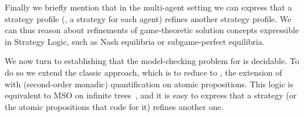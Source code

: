 Finally we briefly mention that in the multi-agent setting we can
express that a strategy profile (\ie, a strategy for each agent)
refines another strategy profile. We can thus reason about refinements
of game-theoretic solution concepts expressible in Strategy Logic,
such as  Nash equilibria or subgame-perfect equilibria.

We now turn to establishing that the model-checking problem for \SLref
is decidable. To do so we extend the classic approach, which is to
reduce to \QCTLs, the extension of \CTLs with (second-order monadic) quantification on atomic
propositions. This logic is equivalent to MSO on infinite
trees~\cite{DBLP:journals/corr/LaroussinieM14}, and it is  easy to
express that a strategy (or the atomic propositions that code for it)
refines another one.



 